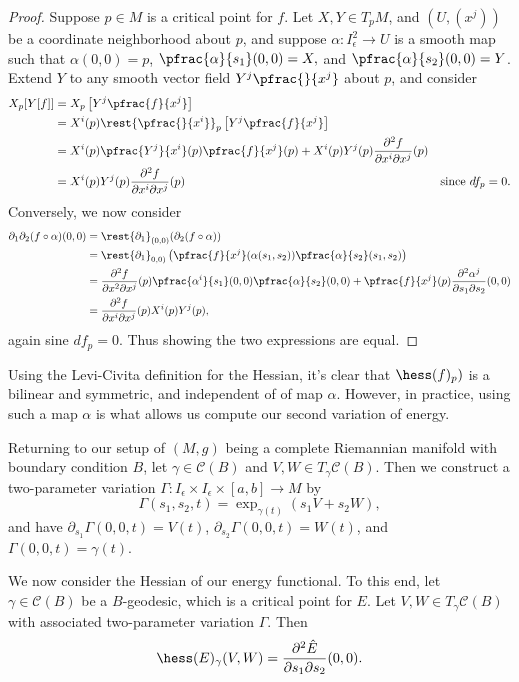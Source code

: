 \begin{proof}
Suppose $p\in M$ is a critical point for $f$.  Let $X,Y\in T_pM$, and $(U,(x^j))$ be a coordinate neighborhood about $p$, and suppose $\alpha:I_\epsilon^2\to U$ is a smooth map such that $\alpha(0,0)=p$, $\pfrac{\alpha}{s_1}(0,0)=X,$ and $\pfrac{\alpha}{s_2}(0,0)=Y$.  Extend $Y$ to any smooth vector field $Y^j\pfrac{}{x^j}$ about $p$, and consider
\begin{align*}
	X_p[Y[f]]&=X_p\left[Y^j\pfrac{f}{x^j}\right]\\
	&=X^i(p)\rest{\pfrac{}{x^i}}_p\left[Y^j\pfrac{f}{x^j}\right]\\
	&=X^i(p)\pfrac{Y^j}{x^i}(p)\pfrac{f}{x^j}(p)+X^i(p)Y^j(p)\frac{\partial^2f}{\partial x^i\partial x^j}(p)\\
	&=X^i(p)Y^j(p)\frac{\partial^2f}{\partial x^i\partial x^j}(p)&\text{since $df_p=0$.}
\end{align*}
Conversely, we now consider
\begin{align*}
	\partial_1\partial_2(f\circ\alpha)(0,0)&=\rest{\partial_1}_{(0,0)}(\partial_2(f\circ\alpha))\\
	&=\rest{\partial_1}_{0,0)}\left(\pfrac{f}{x^j}(\alpha(s_1,s_2))\pfrac{\alpha}{s_2}(s_1,s_2)\right)\\
	&=\frac{\partial^2f}{\partial x^2\partial x^j}(p)\pfrac{\alpha^i}{s_1}(0,0)\pfrac{\alpha}{s_2}(0,0)+\pfrac{f}{x^j}(p)\frac{\partial^2\alpha^j}{\partial s_1\partial s_2}(0,0)\\
	&=\frac{\partial^2f}{\partial x^i\partial x^j}(p)X^i(p)Y^j(p),
\end{align*}
again sine $df_p=0$.  Thus showing the two expressions are equal.
\end{proof}

Using the Levi-Civita definition for the Hessian, it's clear that $\hess(f)_p)$ is a bilinear and symmetric, and independent of of map $\alpha$.  However, in practice, using such a map $\alpha$ is what allows us compute our second variation of energy.


Returning to our setup of $(M,g)$ being a complete Riemannian manifold with boundary condition $B$, let $\gamma\in\mathcal{C}(B)$ and $V,W\in T_\gamma\mathcal{C}(B)$.  Then we construct a two-parameter variation $\Gamma:I_\epsilon\times I_\epsilon\times[a,b]\to M$ by
$$\Gamma(s_1,s_2,t)=\exp_{\gamma(t)}(s_1V+s_2W),$$
and have $\partial_{s_1}\Gamma(0,0,t)=V(t)$, $\partial_{s_2}\Gamma(0,0,t)=W(t)$, and $\Gamma(0,0,t)=\gamma(t)$.

We now consider the Hessian of our energy functional.  To this end, let $\gamma\in\mathcal{C}(B)$ be a $B$-geodesic, which is a critical point for $E$.  Let $V,W\in T_\gamma\mathcal{C}(B)$ with associated two-parameter variation $\Gamma$.  Then
$$\hess(E)_\gamma(V,W)=\frac{\partial^2\hat{E}}{\partial s_1\partial s_2}(0,0).$$

